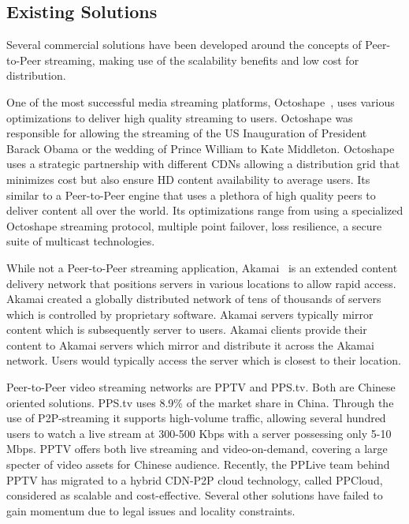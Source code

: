\subsection{Existing Solutions}
\label{subsec:p2p-systems:solutions}

Several commercial solutions have been developed around the concepts of
Peer-to-Peer streaming, making use of the scalability benefits and low cost
for distribution.

One of the most successful media streaming platforms,
Octoshape~\cite{octoshape},
uses various optimizations to deliver high quality streaming to users.
Octoshape was responsible for allowing the streaming of the US Inauguration of
President Barack Obama or the wedding of Prince William to Kate Middleton.
Octoshape uses a strategic partnership with different CDNs allowing a
distribution grid that minimizes cost but also ensure HD content availability
to average users. Its similar to a Peer-to-Peer engine that uses a plethora of
high quality peers to deliver content all over the world. Its optimizations
range from using a specialized Octoshape streaming protocol, multiple point
failover, loss resilience, a secure suite of multicast technologies.

While not a Peer-to-Peer streaming application, Akamai~\cite{akamai} is an
extended content delivery network that positions servers in various locations
to allow rapid access. Akamai created a globally distributed network of
tens of thousands of servers which is controlled by proprietary software.
Akamai servers typically mirror content which is subsequently server to users.
Akamai clients provide their content to Akamai servers which mirror and
distribute it across the Akamai network. Users would typically access the
server which is closest to their location.

Peer-to-Peer video streaming networks are PPTV and PPS.tv. Both are Chinese
oriented solutions. PPS.tv uses 8.9\% of the market share in China. Through
the use of P2P-streaming it supports high-volume traffic, allowing several
hundred users to watch a live stream at 300-500 Kbps with a server possessing
only 5-10 Mbps. PPTV offers both live streaming and video-on-demand, covering
a large specter of video assets for Chinese audience. Recently, the PPLive
team behind PPTV has migrated to a hybrid CDN-P2P cloud technology, called
PPCloud, considered as scalable and cost-effective. Several other solutions
have failed to gain momentum due to legal issues and locality constraints.

